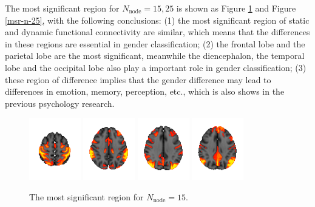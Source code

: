 \documentclass[11pt]{article}
\begin{document}
The most significant region for $N_{\text{node}} = 15, 25$ is shown as Figure \ref{msr-n-15} and Figure \ref{msr-n-25}, with the following conclusions: (1) the most significant region of static and dynamic functional connectivity are similar, which means that the differences in these regions are essential in gender classification; (2) the frontal lobe and the parietal lobe are the most significant, meanwhile the diencephalon, the temporal lobe and the occipital lobe also play a important role in gender classification; (3) these region of difference implies that the gender difference may lead to differences in emotion, memory, perception, etc., which is also shows in the previous psychology research\cite{skaalvik1994gender}\cite{soetanto2006there}\cite{wiesenfeld2005sex}\cite{chaplin2013gender}\cite{fischer2018gender}\cite{guillem2005gender}.

\begin{figure}[H]
    \centering
    \includegraphics[width=0.2\textwidth]{../Analysis/MIR/groupICA/groupICA_3T_HCP1200_MSMAll_d15.ica/0010.png}
    \includegraphics[width=0.2\textwidth]{../Analysis/MIR/groupICA/groupICA_3T_HCP1200_MSMAll_d15.ica/0005.png}
    \includegraphics[width=0.2\textwidth]{../Analysis/MIR/groupICA/groupICA_3T_HCP1200_MSMAll_d15.ica/0008.png}
    \includegraphics[width=0.2\textwidth]{../Analysis/MIR/groupICA/groupICA_3T_HCP1200_MSMAll_d15.ica/0001.png}
    \caption{The most significant region for $N_{\text{node}} = 15$.}
    \label{msr-n-15}
\end{figure}
\end{document}
